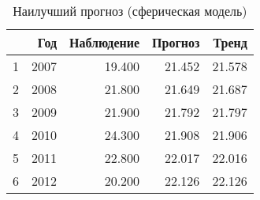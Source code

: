 \begin{table}[ht]
\centering
\begin{tabular}{rrrrr}
  \hline
 & Год & Наблюдение & Прогноз & Тренд \\ 
  \hline
1 & 2007 & 19.400 & 21.452 & 21.578 \\ 
  2 & 2008 & 21.800 & 21.649 & 21.687 \\ 
  3 & 2009 & 21.900 & 21.792 & 21.797 \\ 
  4 & 2010 & 24.300 & 21.908 & 21.906 \\ 
  5 & 2011 & 22.800 & 22.017 & 22.016 \\ 
  6 & 2012 & 20.200 & 22.126 & 22.126 \\ 
   \hline
\end{tabular}
\caption{Наилучший прогноз (сферическая модель)} 
\label{table:manual-best-prediction}
\end{table}
